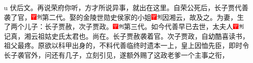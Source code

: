 {u 伏后文。}再说荣府你听，方才所说异事，就出在这里。自荣公死后，长子贾代善袭了官，{\includegraphics[width=3mm]{../Images/00002}\includegraphics[width=3mm]{../Images/00011}\footnotesize \kaishu 第二代。}娶的金陵世勋史侯家的小姐{\includegraphics[width=3mm]{../Images/00002}\includegraphics[width=3mm]{../Images/00011}\footnotesize \kaishu 因湘云，故及之。}为妻，生了两个儿子：长子贾赦，次子贾政。{\includegraphics[width=3mm]{../Images/00002}\includegraphics[width=3mm]{../Images/00011}\footnotesize \kaishu 第三代。}如今代善早已去世，太夫人{\includegraphics[width=3mm]{../Images/00002}\includegraphics[width=3mm]{../Images/00011}\footnotesize \kaishu 记真，湘云祖姑史氏太君也。}尚在。长子贾赦袭着官。次子贾政，自幼酷喜读书，祖父最疼。原欲以科甲出身的，不料代善临终时遗本一上，皇上因恤先臣，即时令长子袭官外，问还有几子，立刻引见，遂额外赐了这政老爹一个主事之衔，{\inc}
